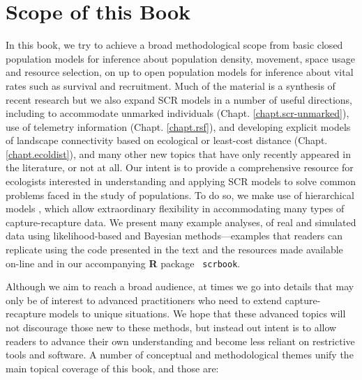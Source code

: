\section{Scope of this Book}  

In this book, we try to achieve a broad methodological scope from
basic closed population models for inference about population density,
movement, space usage and resource selection, on up to open population
models for inference about vital rates such as survival and
recruitment.  Much of the material is a synthesis of recent research
but we also expand SCR models in a number of useful directions,
including to accommodate unmarked individuals
(Chapt. \ref{chapt.scr-unmarked}), use of telemetry information
(Chapt. \ref{chapt.rsf}), and developing explicit models of landscape
connectivity based on ecological or least-cost distance
(Chapt. \ref{chapt.ecoldist}), and many other new topics that have
only recently appeared in the literature, or not at all.  Our intent
is to provide a comprehensive resource for ecologists interested in
understanding and applying SCR models to solve common problems faced
in the study of populations.  To do so, we make use of hierarchical
models \citep{royle_dorazio:2008}, which allow extraordinary
flexibility in accommodating many types of capture-recapture data. We
present many example analyses, of real and simulated data using
likelihood-based and Bayesian methods---examples that readers can
replicate using the code presented in the text and the resources made
available on-line and in our accompanying {\bf R} package {\tt
  scrbook}.

Although we aim to reach a broad audience, at times we go into details
that may only be of interest to advanced practitioners who need to
extend capture-recapture models to unique situations.  We hope that
these advanced topics will not discourage those new to these methods,
but instead out intent is to allow readers to advance their own
understanding and become less reliant on restrictive tools and
software.
A number of conceptual and methodological
themes unify the main topical coverage of this book, and those are:

